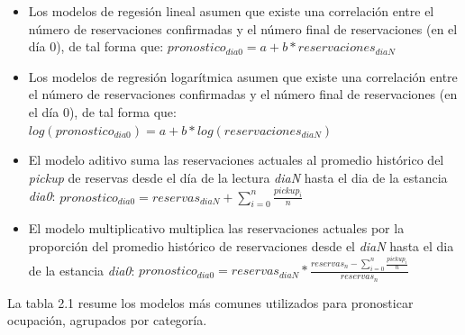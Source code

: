 {\begin{itemize}
  \item Los modelos de regesión lineal asumen que existe una correlación entre el número de reservaciones confirmadas y el número final de reservaciones (en el día 0), de tal forma que: $pronostico_{dia0} = a + b * reservaciones_{diaN}$
  \item Los modelos de regresión logarítmica asumen que existe una correlación entre el número de reservaciones confirmadas y el número final de reservaciones (en el día 0), de tal forma que: $log(pronostico_{dia0}) = a + b * log(reservaciones_{diaN})$
  \item El modelo aditivo suma las reservaciones actuales al promedio histórico del \emph{pickup} de reservas desde el día de la lectura \emph{diaN} hasta el dia de la estancia \emph{dia0}: $pronostico_{dia0} = reservas_{diaN} + \sum_{i=0}^{n} \frac{pickup_i}{n}$
  \item El modelo multiplicativo multiplica las reservaciones actuales por la proporción del promedio histórico de reservaciones  desde el \emph{diaN} hasta el dia de la estancia \emph{dia0}: $pronostico_{dia0} = reservas_{diaN} * \frac{reservas_n - \sum_{i=0}^{n} \frac{pickup_i}{n}}{reservas_n}$
\end{itemize}

La tabla 2.1 resume los modelos más comunes utilizados para pronosticar ocupación, agrupados por categoría.


}
